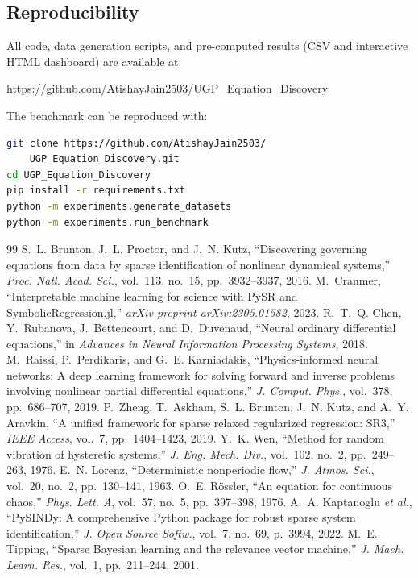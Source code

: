 \documentclass[conference]{IEEEtran}
\begin{document}
\subsection{Reproducibility}
All code, data generation scripts, and pre-computed results (CSV and interactive HTML dashboard) are available at:
\begin{center}
\url{https://github.com/AtishayJain2503/UGP_Equation_Discovery}
\end{center}
The benchmark can be reproduced with:
\begin{lstlisting}[language=bash]
git clone https://github.com/AtishayJain2503/
    UGP_Equation_Discovery.git
cd UGP_Equation_Discovery
pip install -r requirements.txt
python -m experiments.generate_datasets
python -m experiments.run_benchmark
\end{lstlisting}



\begin{thebibliography}{99}
 S.~L. Brunton, J.~L. Proctor, and J.~N. Kutz, ``Discovering governing equations from data by sparse identification of nonlinear dynamical systems,'' \textit{Proc. Natl. Acad. Sci.}, vol.~113, no.~15, pp.~3932--3937, 2016.
 M.~Cranmer, ``Interpretable machine learning for science with PySR and SymbolicRegression.jl,'' \textit{arXiv preprint arXiv:2305.01582}, 2023.
 R.~T.~Q. Chen, Y.~Rubanova, J.~Bettencourt, and D.~Duvenaud, ``Neural ordinary differential equations,'' in \textit{Advances in Neural Information Processing Systems}, 2018.
 M.~Raissi, P.~Perdikaris, and G.~E. Karniadakis, ``Physics-informed neural networks: A deep learning framework for solving forward and inverse problems involving nonlinear partial differential equations,'' \textit{J. Comput. Phys.}, vol.~378, pp.~686--707, 2019.
 P.~Zheng, T.~Askham, S.~L. Brunton, J.~N. Kutz, and A.~Y. Aravkin, ``A unified framework for sparse relaxed regularized regression: SR3,'' \textit{IEEE Access}, vol.~7, pp.~1404--1423, 2019.
 Y.~K. Wen, ``Method for random vibration of hysteretic systems,'' \textit{J. Eng. Mech. Div.}, vol.~102, no.~2, pp.~249--263, 1976.
 E.~N. Lorenz, ``Deterministic nonperiodic flow,'' \textit{J. Atmos. Sci.}, vol.~20, no.~2, pp.~130--141, 1963.
 O.~E. R\"{o}ssler, ``An equation for continuous chaos,'' \textit{Phys. Lett. A}, vol.~57, no.~5, pp.~397--398, 1976.
 A.~A. Kaptanoglu \textit{et al.}, ``PySINDy: A comprehensive Python package for robust sparse system identification,'' \textit{J. Open Source Softw.}, vol.~7, no.~69, p.~3994, 2022.
 M.~E. Tipping, ``Sparse Bayesian learning and the relevance vector machine,'' \textit{J. Mach. Learn. Res.}, vol.~1, pp.~211--244, 2001.
\end{thebibliography}
\end{document}
